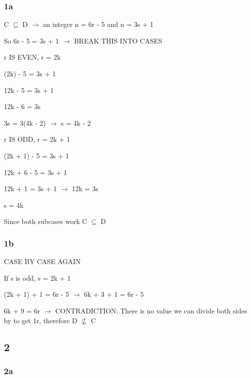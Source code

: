 \documentclass{article}
\begin{document}
\subsubsection{1a}

\noindent C $\subseteq$ D $\rightarrow$ an integer n = 6r - 5 and n = 3s + 1 \vspace{0.5cm}

\noindent So 6r - 5 = 3s + 1 $\rightarrow$ BREAK THIS INTO CASES \vspace{0.5cm}

\noindent r IS EVEN, r = 2k \vspace{0.5cm}

(2k) - 5 = 3s + 1 \par

\noindent 12k - 5 = 3s + 1 \par
\noindent 12k - 6 = 3s \par
\noindent 3s = 3(4k - 2) $\rightarrow$ s = 4k - 2 \vspace{0.5cm}

\noindent r IS ODD, r = 2k  + 1 \vspace{0.5cm}

(2k + 1) - 5 = 3s + 1 \par
\noindent 12k + 6 - 5 = 3s + 1 \par
\noindent 12k + 1 = 3s + 1 $\rightarrow$ 12k = 3s \par
\noindent s = 4k \vspace{0.5cm}

\noindent Since both subcases work C $\subseteq$ D

\subsubsection{1b}

\noindent CASE BY CASE AGAIN

\noindent If s is odd, s = 2k + 1 \vspace{0.5cm}

(2k + 1) + 1 = 6r - 5 $\rightarrow$ 6k + 3 + 1 = 6r - 5\par
\noindent 6k + 9 = 6r $\rightarrow$ CONTRADICTION: There is no value we can divide both sides by to get 1r, therefore D $\not\subseteq$ C

\subsection{2}

\subsubsection{2a}
\end{document}
